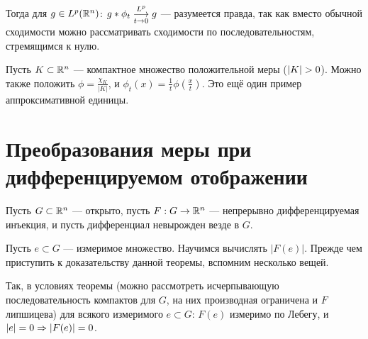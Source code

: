 \documentclass[a4paper]{report}
\begin{document}
    Тогда для $g \in L^p(\mathbb{R}^n)$: $g * \phi_t \underset{t \to 0}{\overset{L^p}{\longrightarrow}} g$ --- разумеется правда, так как вместо обычной сходимости можно рассматривать сходимости по последовательностям, стремящимся к нулю.

    Пусть $K \subset \mathbb{R}^n$ --- компактное множество положительной меры ($\left|K\right| > 0$).
    Можно также положить $\phi = \frac{\chi_K}{|K|}$, и $\phi_t(x) = \frac{1}{t}\phi\left(\frac{x}{t}\right)$.
    Это ещё один пример аппроксимативной единицы.


    \section{Преобразования меры при дифференцируемом отображении}
    Пусть $G \subset \mathbb{R}^n$ --- открыто, пусть $F: G \rightarrow \mathbb{R}^n$ --- непрерывно дифференцируемая инъекция, и пусть дифференциал невырожден везде в $G$.

    Пусть $e \subset G$ --- измеримое множество.
    Научимся вычислять $|F(e)|$.
    Прежде чем приступить к доказательству данной теоремы, вспомним несколько вещей.

    Так, в условиях теоремы (можно рассмотреть исчерпывающую последовательность компактов для $G$, на них производная ограничена и $F$ липшицева) для всякого измеримого $e \subset G$: $F(e)$ измеримо по Лебегу, и $|e| = 0 \Rightarrow |F(e)| = 0$.
\end{document}
